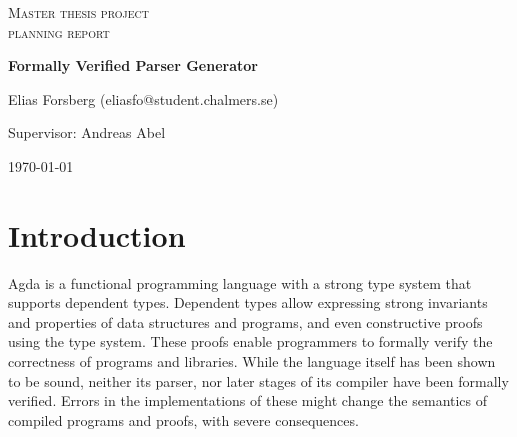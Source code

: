 \documentclass{article}
\begin{document}
\begin{titlepage}


\centering


{\scshape\LARGE Master thesis project \\ planning report\\}

\vspace{0.5cm}

{\huge\bfseries Formally Verified Parser Generator\\}

\vspace{2cm}

{\Large Elias Forsberg (eliasfo@student.chalmers.se)\\}

\vspace{1.0cm}

{\large Supervisor: Andreas Abel\\}

\vfill

{\large \today\\}

\end{titlepage}

\section{Introduction}

	Agda is a functional programming language with a strong type system that
	supports dependent types. Dependent types allow expressing strong invariants and
	properties of data structures and programs, and even constructive proofs
	using the type system. These proofs enable programmers to formally verify
	the correctness of programs and libraries. While the language itself has
	been shown to be sound, neither its parser, nor later stages of its
	compiler have been formally verified. Errors in the implementations of
	these might change the semantics of compiled programs and proofs,
	with severe consequences. %
\end{document}
